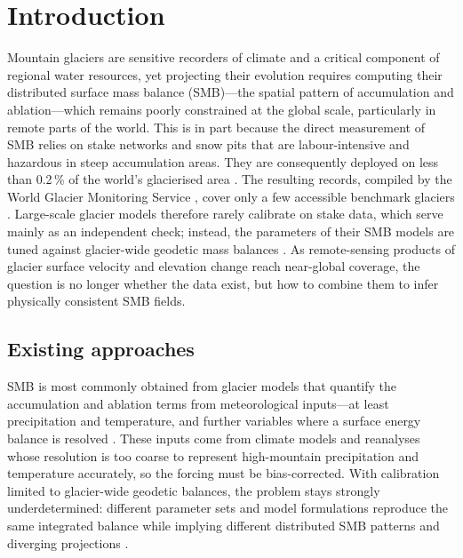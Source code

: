\section{Introduction}\label{sec:intro}

Mountain glaciers are sensitive recorders of climate and a critical component of regional water resources, yet projecting their evolution requires computing their distributed surface mass balance (SMB)---the spatial pattern of accumulation and ablation---which remains poorly constrained at the global scale, particularly in remote parts of the world.
This is in part because the direct measurement of SMB relies on stake networks and snow pits that are labour-intensive and hazardous in steep accumulation areas. They are consequently deployed on less than 0.2\,\% of the world's glacierised area \citep{cogley2011}. The resulting records, compiled by the World Glacier Monitoring Service \citep{wgms2025}, cover only a few accessible benchmark glaciers \citep{zemp2019}.
Large-scale glacier models therefore rarely calibrate on stake data, which serve mainly as an independent check; instead, the parameters of their SMB models are tuned against glacier-wide geodetic mass balances \citep{marzeion2012, radic2014, hugonnet2021}.
As remote-sensing products of glacier surface
velocity \citep{millan2022} and
elevation change \citep{hugonnet2021, beraud2023} reach near-global coverage, the
question is no longer whether the data exist, but how to combine them to infer
physically consistent SMB fields.

\subsection{Existing approaches}\label{sec:sota}
SMB is most commonly obtained from glacier models that quantify the accumulation and ablation terms from meteorological inputs---at least precipitation and temperature, and further variables where a surface energy balance is resolved \citep{marzeion2012, rounce2020, buri2023}. These inputs come from climate models and reanalyses whose resolution is too coarse to represent high-mountain precipitation and temperature accurately, so the forcing must be bias-corrected. With calibration limited to glacier-wide geodetic balances, the problem stays strongly underdetermined: different parameter sets and model formulations reproduce the same integrated balance while implying different distributed SMB patterns and diverging projections \citep{rounce2020quantifying, schuster2023glacier}. 

